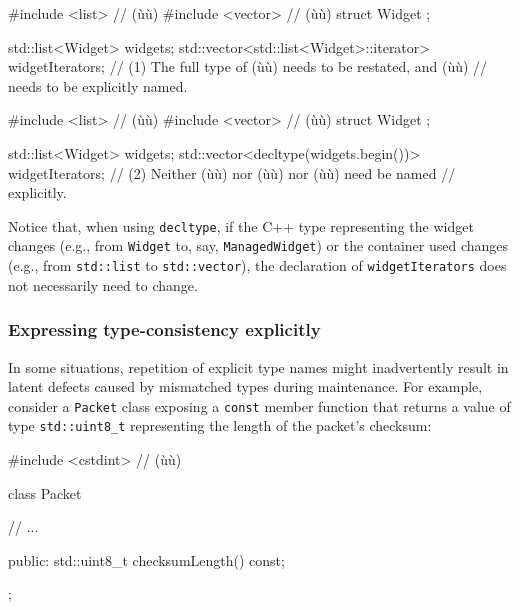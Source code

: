 \begin{emcppshiddenlisting}[emcppsbatch=e4]
#include <list>    // (ù{}ù)
#include <vector>  // (ù{}ù)
struct Widget {};
\end{emcppshiddenlisting}
\begin{emcppslisting}[emcppsbatch=e4]
std::list<Widget> widgets;
std::vector<std::list<Widget>::iterator> widgetIterators;
    // (1) The full type of (ù{}ù) needs to be restated, and (ù{}ù)
    // needs to be explicitly named.
\end{emcppslisting}
\begin{emcppshiddenlisting}[emcppsbatch=e4-1]
#include <list>    // (ù{}ù)
#include <vector>  // (ù{}ù)
struct Widget {};
\end{emcppshiddenlisting}
\begin{emcppslisting}[emcppsbatch=e4-1]
std::list<Widget> widgets;
std::vector<decltype(widgets.begin())> widgetIterators;
    // (2) Neither (ù{}ù) nor (ù{}ù) nor (ù{}ù) need be named
    // explicitly.
\end{emcppslisting}

\noindent Notice that, when using \lstinline!decltype!, if the C++ type representing
the widget changes (e.g., from \lstinline!Widget! to, say,
\lstinline!ManagedWidget!) or the container used changes (e.g., from
\lstinline!std::list! to \lstinline!std::vector!), the declaration of
\lstinline!widgetIterators! does not necessarily need to change.

\subsubsection[Expressing type-consistency explicitly]{Expressing type-consistency explicitly}\label{expressing-type-consistency-explicitly}

In some situations, repetition of explicit type names might
inadvertently result in latent defects caused by mismatched types during
maintenance. For example, consider a \lstinline!Packet! class exposing a
\lstinline!const! member function that returns a value of type \lstinline!std::uint8_t!
representing the length of the packet's checksum:

\begin{emcppshiddenlisting}[emcppsbatch=e6]
#include <cstdint>  // (ù{}ù)
\end{emcppshiddenlisting}
\begin{emcppslisting}[emcppsbatch=e6]
class Packet
{
    // ...

public:
    std::uint8_t checksumLength() const;
};
\end{emcppslisting}


